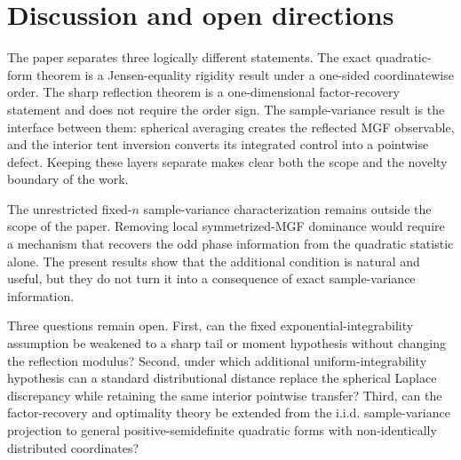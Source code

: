 \section{Discussion and open directions}\label{sec:discussion}

The paper separates three logically different statements. The exact quadratic-form theorem is a Jensen-equality rigidity result under a one-sided coordinatewise order. The sharp reflection theorem is a one-dimensional factor-recovery statement and does not require the order sign. The sample-variance result is the interface between them: spherical averaging creates the reflected MGF observable, and the interior tent inversion converts its integrated control into a pointwise defect. Keeping these layers separate makes clear both the scope and the novelty boundary of the work.

The unrestricted fixed-$n$ sample-variance characterization remains outside the scope of the paper. Removing local symmetrized-MGF dominance would require a mechanism that recovers the odd phase information from the quadratic statistic alone. The present results show that the additional condition is natural and useful, but they do not turn it into a consequence of exact sample-variance information.

Three questions remain open. First, can the fixed exponential-integrability assumption be weakened to a sharp tail or moment hypothesis without changing the reflection modulus? Second, under which additional uniform-integrability hypothesis can a standard distributional distance replace the spherical Laplace discrepancy while retaining the same interior pointwise transfer? Third, can the factor-recovery and optimality theory be extended from the i.i.d. sample-variance projection to general positive-semidefinite quadratic forms with non-identically distributed coordinates?
